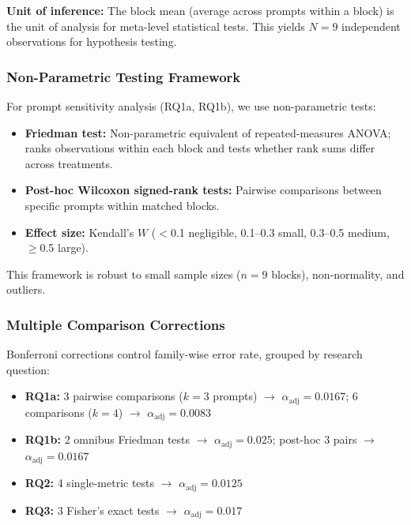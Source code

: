\textbf{Unit of inference:} The block mean (average across prompts within a block) is the unit of analysis for meta-level statistical tests. This yields $N=9$ independent observations for hypothesis testing.

\subsubsection{Non-Parametric Testing Framework}
\label{sec:nonparam_framework}

For prompt sensitivity analysis (RQ1a, RQ1b), we use non-parametric tests:
\begin{itemize}[noitemsep]
    \item \textbf{Friedman test:} Non-parametric equivalent of repeated-measures ANOVA; ranks observations within each block and tests whether rank sums differ across treatments.
    \item \textbf{Post-hoc Wilcoxon signed-rank tests:} Pairwise comparisons between specific prompts within matched blocks.
    \item \textbf{Effect size:} Kendall's $W$ ($<$0.1 negligible, 0.1--0.3 small, 0.3--0.5 medium, $\geq$0.5 large).
\end{itemize}

This framework is robust to small sample sizes ($n=9$ blocks), non-normality, and outliers.

\subsubsection{Multiple Comparison Corrections}
\label{sec:multiple_comparisons}

Bonferroni corrections control family-wise error rate, grouped by research question:
\begin{itemize}[noitemsep]
    \item \textbf{RQ1a:} 3 pairwise comparisons ($k=3$ prompts) $\rightarrow$ $\alpha_{\text{adj}} = 0.0167$; 6 comparisons ($k=4$) $\rightarrow$ $\alpha_{\text{adj}} = 0.0083$
    \item \textbf{RQ1b:} 2 omnibus Friedman tests $\rightarrow$ $\alpha_{\text{adj}} = 0.025$; post-hoc 3 pairs $\rightarrow$ $\alpha_{\text{adj}} = 0.0167$
    \item \textbf{RQ2:} 4 single-metric tests $\rightarrow$ $\alpha_{\text{adj}} = 0.0125$
    \item \textbf{RQ3:} 3 Fisher's exact tests $\rightarrow$ $\alpha_{\text{adj}} = 0.017$
\end{itemize}

